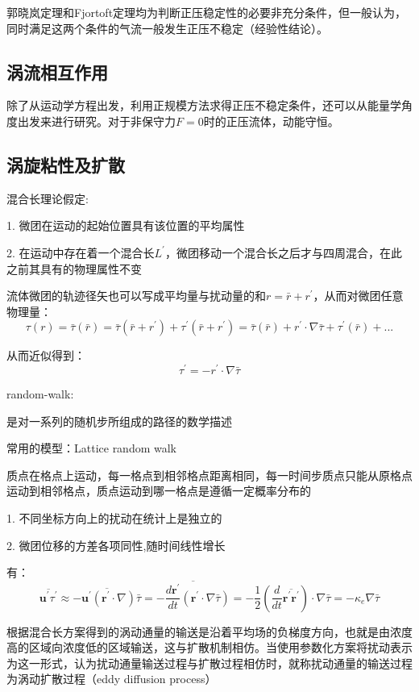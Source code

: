 \documentclass{article}
\begin{document}
郭晓岚定理和Fjortoft定理均为判断正压稳定性的必要非充分条件，但一般认为，同时满足这两个条件的气流一般发生正压不稳定（经验性结论）。

\subsection{涡流相互作用}
除了从运动学方程出发，利用正规模方法求得正压不稳定条件，还可以从能量学角度出发来进行研究。对于非保守力$F=0$时的正压流体，动能守恒。


\subsection{涡旋粘性及扩散}
混合长理论假定:

1. 微团在运动的起始位置具有该位置的平均属性

2. 在运动中存在着一个混合长$L^{\prime}$，微团移动一个混合长之后才与四周混合，在此之前其具有的物理属性不变

流体微团的轨迹径矢也可以写成平均量与扰动量的和$r=\bar{r}+r^{\prime}$，从而对微团任意物理量：
$$\tau(r) = \bar{\tau}(\bar{r}) =  \bar{\tau}(\bar{r}+r^{\prime}) + \tau^{\prime}(\bar{r}+r^{\prime}) = \bar{\tau}(\bar{r})+r^{\prime}\cdot\nabla\bar{\tau}+\tau^{\prime}(\bar{r})+...$$

从而近似得到：
$$\tau^{\prime}=-r^{\prime}\cdot\nabla\bar{\tau}$$

random-walk:

是对一系列的随机步所组成的路径的数学描述

常用的模型：Lattice random walk

质点在格点上运动，每一格点到相邻格点距离相同，每一时间步质点只能从原格点运动到相邻格点，质点运动到哪一格点是遵循一定概率分布的

1. 不同坐标方向上的扰动在统计上是独立的

2. 微团位移的方差各项同性,随时间线性增长

有：
$$\overline{\mathbf{{u}^{\prime}}{\tau }^{\prime}}\approx \overline{-\mathbf{{u}^{\prime}}\left( \mathbf{r}^{\prime}\cdot \nabla  \right)\bar{\tau }}=\overline{-\frac{d\mathbf{r}^{\prime}}{dt}\left( \mathbf{r}^{\prime}\cdot \nabla \bar{\tau } \right)}=-\frac{1}{2}\left( \frac{d}{dt}\overline{\mathbf{r}^{\prime}\mathbf{r}^{\prime}} \right)\cdot \nabla \bar{\tau }=-{{\kappa }_{e}}\nabla \bar{\tau }$$

根据混合长方案得到的涡动通量的输送是沿着平均场的负梯度方向，也就是由浓度高的区域向浓度低的区域输送，这与扩散机制相仿。当使用参数化方案将扰动表示为这一形式，认为扰动通量输送过程与扩散过程相仿时，就称扰动通量的输送过程为涡动扩散过程（eddy diffusion process）
\end{document}
